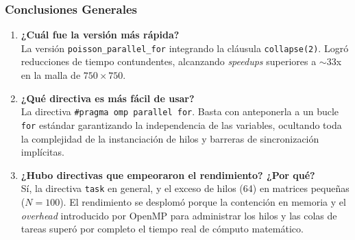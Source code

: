 \subsubsection*{Conclusiones Generales}
\begin{enumerate}
    \item \textbf{¿Cuál fue la versión más rápida?} \\
    La versión \texttt{poisson\_parallel\_for} integrando la cláusula \texttt{collapse(2)}. Logró reducciones de tiempo contundentes, alcanzando \textit{speedups} superiores a $\sim$33x en la malla de $750 \times 750$.
    \item \textbf{¿Qué directiva es más fácil de usar?} \\
    La directiva \texttt{\#pragma omp parallel for}. Basta con anteponerla a un bucle \texttt{for} estándar garantizando la independencia de las variables, ocultando toda la complejidad de la instanciación de hilos y barreras de sincronización implícitas.
    \item \textbf{¿Hubo directivas que empeoraron el rendimiento? ¿Por qué?} \\
    Sí, la directiva \texttt{task} en general, y el exceso de hilos (64) en matrices pequeñas ($N=100$). El rendimiento se desplomó porque la contención en memoria y el \textit{overhead} introducido por OpenMP para administrar los hilos y las colas de tareas superó por completo el tiempo real de cómputo matemático.
\end{enumerate}


